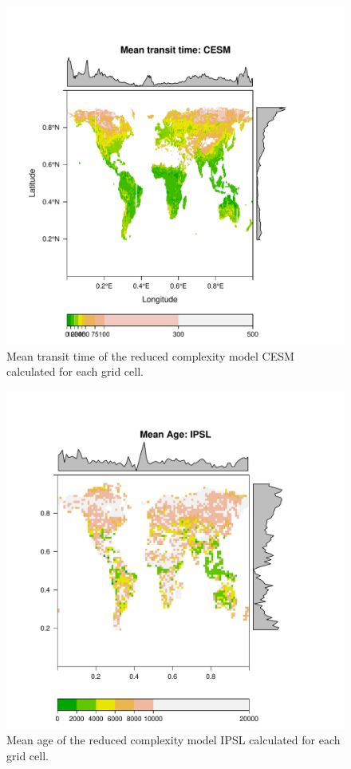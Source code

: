 \documentclass{agujournal}
\begin{document}
\begin{figure}[t]
   \centering
   \includegraphics{Figures/mapTTcolors_CESM} %
   \caption{Mean transit time of the reduced complexity model CESM calculated for each grid cell. }
\end{figure}

\begin{figure}[t]
   \centering
   \includegraphics{Figures/mapAcolors_IPSL} %
   \caption{Mean age of the reduced complexity model IPSL calculated for each grid cell. }
\end{figure}
\end{document}
